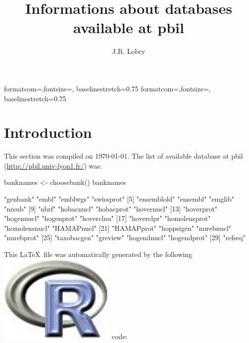 \documentclass{article}
\title{Informations about databases available at pbil}
\author{J.R. Lobry}
\begin{document}
%
%
{formatcom={\color{Sinput}},fontsize=\footnotesize, baselinestretch=0.75}
{formatcom={\color{Soutput}},fontsize=\footnotesize, baselinestretch=0.75}
%
%
\newcommand{\Rlogo}{\protect\includegraphics[height=1.8ex,keepaspectratio]{../figs/Rlogo.pdf}}
%
%
\newcommand{\seqinr}{\texttt{seqin\bf{R}}}
\newcommand{\Seqinr}{\texttt{Seqin\bf{R}}}
%
%
%
%
%


\maketitle
\label{subsequence}

\section{Introduction}
This section was compiled on \today. The list of available database at pbil 
(\url{http://pbil.univ-lyon1.fr/}) was:

\begin{Schunk}
\begin{Sinput}
 banknames <- choosebank()
 banknames
\end{Sinput}
\begin{Soutput}
 [1] "genbank"      "embl"         "emblwgs"      "swissprot"   
 [5] "ensemblold"   "ensembl"      "emglib"       "nrsub"       
 [9] "nbrf"         "hobacnucl"    "hobacprot"    "hovernucl"   
[13] "hoverprot"    "hogennucl"    "hogenprot"    "hoverclnu"   
[17] "hoverclpr"    "homolensprot" "homolensnucl" "HAMAPnucl"   
[21] "HAMAPprot"    "hoppsigen"    "nurebnucl"    "nurebprot"   
[25] "taxobacgen"   "greview"      "hogendnucl"   "hogendprot"  
[29] "refseq"      
\end{Soutput}
\end{Schunk}

This \LaTeX~file was automatically generated by the following \Rlogo{}~code:
\end{document}
